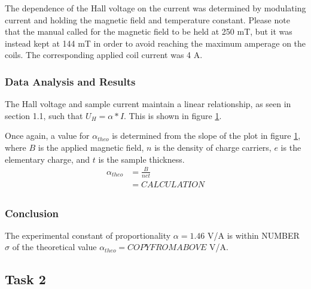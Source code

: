 \documentclass[a4paper]{article}
\begin{document}
\qq The dependence of the Hall voltage on the current was determined 
by modulating current and holding the magnetic field and temperature 
constant. Please note that the manual called for the magnetic field to 
be held at 250 mT, but it was instead kept at 144 mT in order to 
avoid reaching the maximum amperage on the coils. The corresponding
applied coil current was 4 A.

\subsubsection{Data Analysis and Results}
The Hall voltage and sample current maintain a linear relationship, as seen in section 1.1, such that $U_H = \alpha * I$. This is shown in figure \ref{task31plot}.

\begin{figure}[H]
\centering
\label{task31plot}
\end{figure}

Once again, a value for $\alpha_{theo}$ is determined from the slope of the plot in figure \ref{task31plot}, where $B$ is the applied magnetic field, $n$ is the density of charge carriers, $e$ is the elementary charge, and $t$ is the sample thickness.
\begin{align*}
\alpha_{theo} &= \frac{B}{net} \\
			  &= CALCULATION \\
\end{align*}

\subsubsection{Conclusion}
The experimental constant of proportionality $\alpha = 1.46 $ V/A is within NUMBER $\sigma$ of the theoretical value $\alpha_{theo} = COPYFROMABOVE$ V/A.

\subsection{Task 2}
\end{document}
